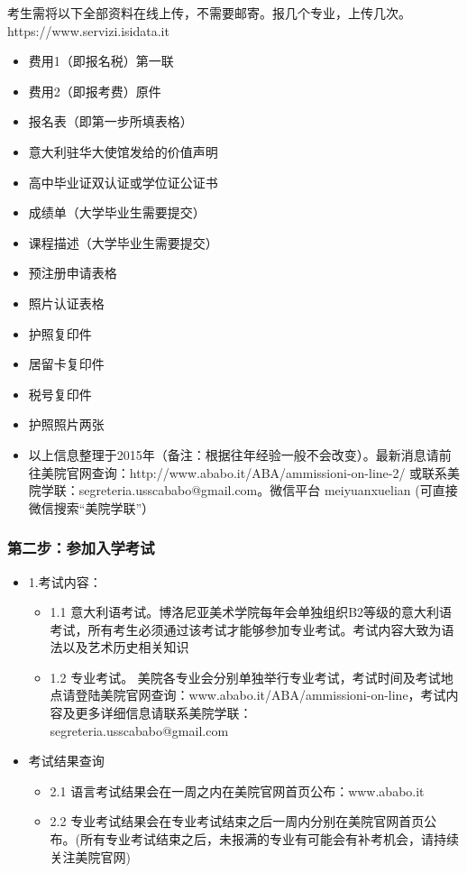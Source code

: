 \documentclass[3pt,a5paper,openright,twoside]{book}
\begin{document}
考生需将以下全部资料在线上传，不需要邮寄。报几个专业，上传几次。https://www.servizi.isidata.it
\begin{itemize}
    \item  费用1（即报名税）第一联
    \item  费用2（即报考费）原件
    \item  报名表（即第一步所填表格）
    \item  意大利驻华大使馆发给的价值声明
    \item  高中毕业证双认证或学位证公证书
    \item  成绩单（大学毕业生需要提交）
    \item  课程描述（大学毕业生需要提交）
    \item  预注册申请表格
    \item  照片认证表格
    \item  护照复印件
    \item  居留卡复印件
    \item  税号复印件
    \item  护照照片两张
    \item  以上信息整理于2015年（备注：根据往年经验一般不会改变）。最新消息请前往美院官网查询：http://www.ababo.it/ABA/ammissioni-on-line-2/ 或联系美院学联：segreteria.usscababo@gmail.com。微信平台  meiyuanxuelian (可直接微信搜索“美院学联”）
\end{itemize}

\subsubsection{第二步：参加入学考试}
\begin{itemize}
  \item  1.考试内容：
    \begin{itemize}
      \item  1.1 意大利语考试。博洛尼亚美术学院每年会单独组织B2等级的意大利语考试，所有考生必须通过该考试才能够参加专业考试。考试内容大致为语法以及艺术历史相关知识
      \item  1.2 专业考试。 美院各专业会分别单独举行专业考试，考试时间及考试地点请登陆美院官网查询：www.ababo.it/ABA/ammissioni-on-line，考试内容及更多详细信息请联系美院学联：\\
      segreteria.usscababo@gmail.com
    \end{itemize}
  \item  考试结果查询
     \begin{itemize}
      \item  2.1 语言考试结果会在一周之内在美院官网首页公布：www.ababo.it
      \item  2.2 专业考试结果会在专业考试结束之后一周内分别在美院官网首页公布。(所有专业考试结束之后，未报满的专业有可能会有补考机会，请持续关注美院官网)
    \end{itemize}
 \end{itemize}
\end{document}
